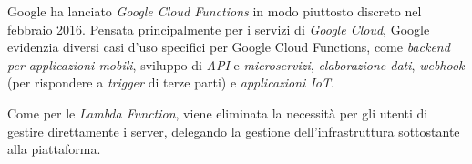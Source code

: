 Google ha lanciato \textit{Google Cloud Functions} in modo piuttosto discreto nel febbraio 2016. Pensata principalmente per i servizi di \textit{Google Cloud}, Google evidenzia diversi casi d'uso specifici per Google Cloud Functions, come \textit{backend per applicazioni mobili}, sviluppo di \textit{API} e \textit{microservizi}, \textit{elaborazione dati}, \textit{webhook} (per rispondere a \textit{trigger} di terze parti) e \textit{applicazioni IoT}.\cite{lynn2017preliminary}

Come per le \textit{Lambda Function}, viene eliminata la necessità per gli utenti di gestire direttamente i server, delegando la gestione dell'infrastruttura sottostante alla piattaforma.
